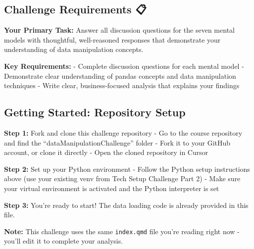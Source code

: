 \documentclass[
  letterpaper,
  DIV=11,
  numbers=noendperiod]{scrartcl}
\begin{document}
\subsection{Challenge Requirements 📋}\label{challenge-requirements}

\textbf{Your Primary Task:} Answer all discussion questions for the
seven mental models with thoughtful, well-reasoned responses that
demonstrate your understanding of data manipulation concepts.

\textbf{Key Requirements:} - Complete discussion questions for each
mental model - Demonstrate clear understanding of pandas concepts and
data manipulation techniques - Write clear, business-focused analysis
that explains your findings

\subsection{Getting Started: Repository Setup
🚀}\label{getting-started-repository-setup}

\begin{tcolorbox}[enhanced jigsaw, colbacktitle=quarto-callout-important-color!10!white, opacitybacktitle=0.6, colframe=quarto-callout-important-color-frame, coltitle=black, left=2mm, titlerule=0mm, title=\textcolor{quarto-callout-important-color}{\faExclamation}\hspace{0.5em}{📁 Getting Started}, bottomtitle=1mm, opacityback=0, arc=.35mm, rightrule=.15mm, colback=white, breakable, bottomrule=.15mm, toprule=.15mm, toptitle=1mm, leftrule=.75mm]

\textbf{Step 1:} Fork and clone this challenge repository - Go to the
course repository and find the ``dataManipulationChallenge'' folder -
Fork it to your GitHub account, or clone it directly - Open the cloned
repository in Cursor

\textbf{Step 2:} Set up your Python environment - Follow the Python
setup instructions above (use your existing venv from Tech Setup
Challenge Part 2) - Make sure your virtual environment is activated and
the Python interpreter is set

\textbf{Step 3:} You're ready to start! The data loading code is already
provided in this file.

\textbf{Note:} This challenge uses the same \texttt{index.qmd} file
you're reading right now - you'll edit it to complete your analysis.

\end{tcolorbox}
\end{document}
